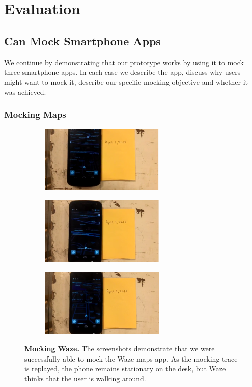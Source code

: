 \section{Evaluation}
\label{sec-evaluation}
\subsection{\PocketMocker{} Can Mock Smartphone Apps}
\label{subsec-mockingapps}

We continue by demonstrating that our \PocketMocker{} prototype works by using
it to mock three smartphone apps. In each case we describe the app, discuss why
users might want to mock it, describe our specific mocking objective and
whether it was achieved.

\subsubsection{Mocking Maps}

\begin{figure}[t]

\begin{subfigure}[t]{2.33in}
\includegraphics[width=2.33in]{./figures/apps/waze/waze1.png}
\caption{}
\end{subfigure}%
\begin{subfigure}[t]{2.33in}
\includegraphics[width=2.33in]{./figures/apps/waze/waze2.png}
\caption{}
\end{subfigure}%
\begin{subfigure}[t]{2.33in}
\includegraphics[width=2.33in]{./figures/apps/waze/waze3.png}
\caption{}
\end{subfigure}%

\caption{\textbf{Mocking Waze.} The screenshots demonstrate that we were
successfully able to mock the Waze maps app. As the mocking trace is
replayed, the phone remains stationary on the desk, but Waze thinks that the
user is walking around.}

\label{fig-mocking-waze}

\end{figure}

